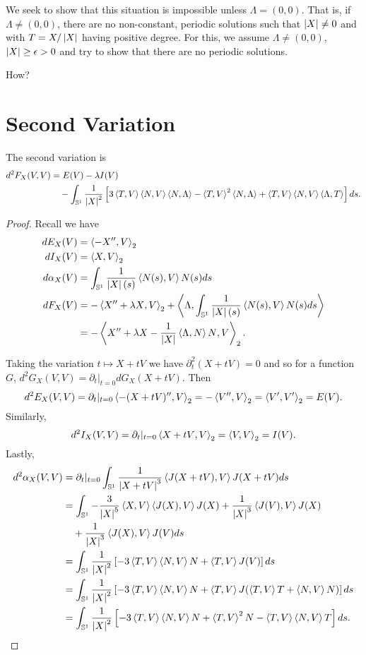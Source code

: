 \documentclass[12pt]{article}
\begin{document}
We seek to show that this situation is impossible unless \(\Lambda = (0, 0)\). That is, if \(\Lambda \ne (0, 0)\), there are no non-constant, periodic solutions such that \(\abs{X} \ne 0\) and with \(T = X/\abs{X}\) having positive degree. For this, we assume \(\Lambda \ne (0, 0)\), \(\abs{X} \geq \epsilon > 0\) and try to show that there are no periodic solutions.

{\color{red}How?}

\section{Second Variation}

\begin{lem}
The second variation is
\[
\begin{split}
d^2F_X (V, V) &= E(V) - \lambda I(V) \\
&\quad - \int_{\So} \frac{1}{\abs{X}^2} \left[3\inpr{T}{V}\inpr{N}{V} \inpr{N}{\Lambda} - \inpr{T}{V}^2 \inpr{N}{\Lambda} + \inpr{T}{V}\inpr{N}{V} \inpr{\Lambda}{T} \right] ds.
\end{split}
\]
\end{lem}

\begin{proof}
Recall we have
\begin{align*}
dE_X (V) &= \inpr{-X''}{V}_2 \\
dI_X (V) &= \inpr{X}{V}_2 \\
d\alpha_X (V) &= \int_{\So} \frac{1}{\abs{X}(s)} \inpr{N(s)}{V} N(s) ds \\
dF_X (V) &= -\inpr{X'' + \lambda X}{V}_2 + \inpr{\Lambda}{\int_{\So} \frac{1}{\abs{X}(s)} \inpr{N(s)}{V} N(s) ds} \\
&= -\inpr{X'' + \lambda X - \frac{1}{\abs{X}} \inpr{\Lambda}{N}N}{V}_2.
\end{align*}

Taking the variation \(t \mapsto X + tV\) we have \(\partial_t^2 (X + tV) = 0\) and so for a function \(G\), \(d^2G_X (V, V) = \partial_t|_{t=0} dG_X(X + t V)\).
Then
\[
d^2E_X(V, V) = \partial_t|_{t=0} \inpr{-(X + tV)''}{V}_2 = -\inpr{V''}{V}_2 = \inpr{V'}{V'}_2 = E(V).
\]
Similarly,
\[
d^2I_X(V, V) = \partial_t|_{t=0} \inpr{X + t V}{V}_2 = \inpr{V}{V}_2 = I(V).
\]
Lastly,
\[
\begin{split}
d^2\alpha_X(V, V) &= \partial_t|_{t=0} \int_{\So} \frac{1}{\abs{X+tV}^3} \inpr{J(X+tV)}{V} J(X + tV) ds \\
&= \int_{\So} -\frac{3}{\abs{X}^5} \inpr{X}{V} \inpr{J(X)}{V} J(X) + \frac{1}{\abs{X}^3} \inpr{J(V)}{V} J(X) \\
&\quad + \frac{1}{\abs{X}^3} \inpr{J(X)}{V} J(V) ds \\
&= \int_{\So} \frac{1}{\abs{X}^2}\left[-3\inpr{T}{V}\inpr{N}{V} N + \inpr{T}{V} J(V)\right] ds \\
&= \int_{\So} \frac{1}{\abs{X}^2} \left[-3\inpr{T}{V}\inpr{N}{V} N + \inpr{T}{V} J(\inpr{T}{V} T + \inpr{N}{V} N) \right] ds \\
&= \int_{\So} \frac{1}{\abs{X}^2} \left[-3\inpr{T}{V}\inpr{N}{V} N + \inpr{T}{V}^2 N - \inpr{T}{V}\inpr{N}{V} T \right] ds.
\end{split}
\]
\end{proof}
\end{document}
